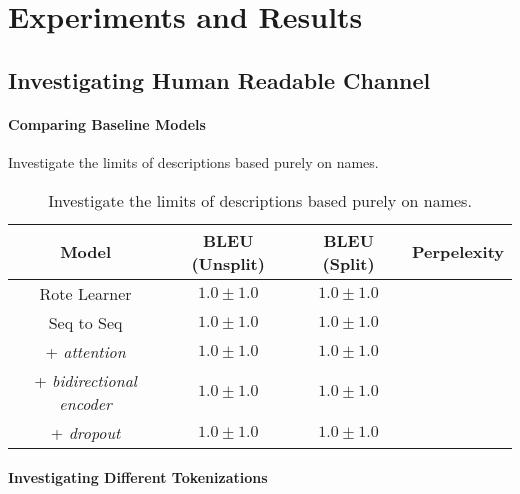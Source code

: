 \chapter{Experiments and Results}
\label{experiments_and_results}

\section{Investigating Human Readable Channel} %
\label{sec:investigating_human_readable_channel}


\subsubsection{Comparing Baseline Models} %
\label{ssub:comparing_baseline_models}

Investigate the limits of descriptions based purely on names.

\begin{table}[h!]
\begin{center}
\begin{tabular}{ c | c | c | c }
    Model                             & BLEU (Unsplit)  & BLEU (Split)    & Perpelexity \\
    \hline
    Rote Learner                      & $1.0 \pm 1.0 $  & $1.0 \pm 1.0 $  & \\
    \hline
    Seq to Seq                        & $1.0 \pm 1.0 $  & $1.0 \pm 1.0 $  &  \\
    + \textit{attention}              & $1.0 \pm 1.0 $  & $1.0 \pm 1.0 $  & \\
    + \textit{bidirectional encoder}  & $1.0 \pm 1.0 $  & $1.0 \pm 1.0 $  & \\
    + \textit{dropout}                & $1.0 \pm 1.0 $  & $1.0 \pm 1.0 $  & \\
    \hline
\end{tabular}
\caption {Investigate the limits of descriptions based purely on names.}
\label{table:name_baseline}
\end{center}
\end{table}




\subsubsection{Investigating Different Tokenizations} %
\label{ssub:investigating_different_tokenizations}


